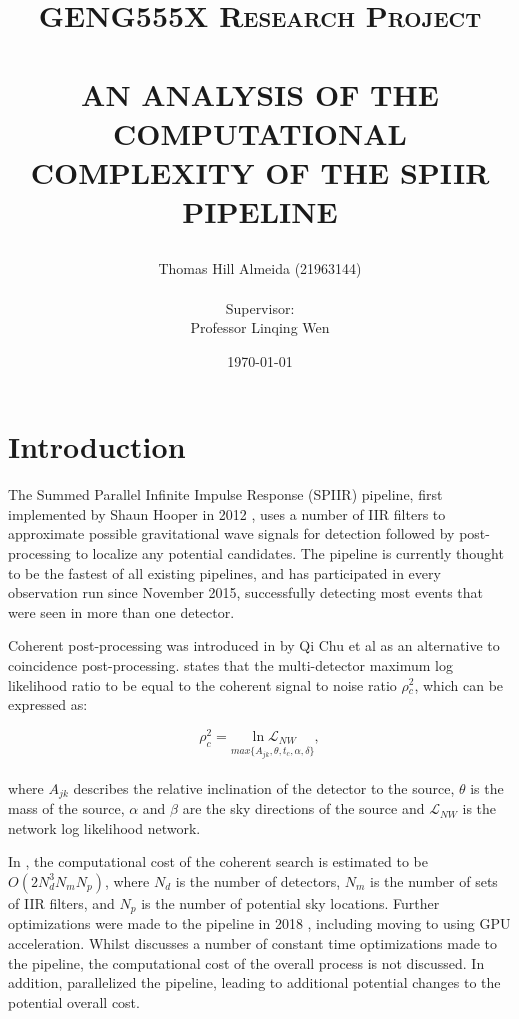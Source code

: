 \documentclass{article}
\title{\normalsize \textsc{GENG555X Research Project}
        \\ [1.5cm]
        \HRule{0.5pt} \\
        \LARGE \textbf{\uppercase{An analysis of the computational complexity of the SPIIR pipeline}}
        \HRule{2pt} \\ [0.5cm]
        \normalsize \date{\today} \vspace*{3\baselineskip}}
\author{Thomas Hill Almeida (21963144)\\
\\
Supervisor:\\
Professor Linqing Wen
}
\date{}
\begin{document}
\maketitle{}
\tableofcontents{}
\newpage{}

\section{Introduction} \label{sec:intro}

The Summed Parallel Infinite Impulse Response (SPIIR) pipeline, first implemented by Shaun Hooper in 2012 \cite{SPIIRCreate}, uses a number of IIR filters to approximate possible gravitational wave signals for detection followed by post-processing to localize any potential candidates.
The pipeline is currently thought to be the fastest of all existing pipelines, and has participated in every observation run since November 2015, successfully detecting most events that were seen in more than one detector.

Coherent post-processing was introduced in \cite{ChuThesis} by Qi Chu et al as an alternative to coincidence post-processing.
\cite{ChuThesis} states that the multi-detector maximum log likelihood ratio to be equal to the coherent signal to noise ratio \(\rho{}^2_c\), which can be expressed as:

\begin{equation}
    \rho^2_c = \underset{max\{A_{jk},\theta,t_{c},\alpha,\delta\}}{\ln \mathcal{L}_{NW}},
\end{equation}
\\
where \(A_{jk}\) describes the relative inclination of the detector to the source, \(\theta\) is the mass of the source, \(\alpha\) and \(\beta\) are the sky directions of the source and \(\mathcal{L}_{NW}\) is the network log likelihood network.

In \cite{ChuThesis}, the computational cost of the coherent search is estimated to be \(O(2N^3_dN_mN_p)\), where \(N_d\) is the number of detectors, \(N_m\) is the number of sets of IIR filters, and \(N_p\) is the number of potential sky locations.
Further optimizations were made to the pipeline in 2018 \cite{SPIIRGPU2018}, including moving to using GPU acceleration.
Whilst \cite{SPIIRGPU2018} discusses a number of constant time optimizations made to the pipeline, the computational cost of the overall process is not discussed.
In addition, \cite{SPIIRGPU2018} parallelized the pipeline, leading to additional potential changes to the potential overall cost.
\end{document}
